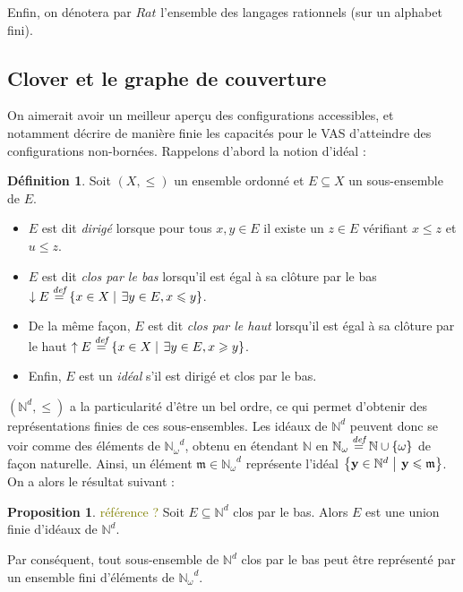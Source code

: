 \documentclass[a4paper,final]{article}
\theoremstyle{definition}
\newtheorem{Definition}[Theorem]{Définition}
\newtheorem{Proposition}[Theorem]{Proposition}
\let\leq\leqslant
\let\geq\geqslant
\newcommand{\lucas}[1]{\textcolor{olive}{#1}}
\newcommand{\set}[2]{\left\{#1\mathrel{\left|\vphantom{#1}\vphantom{#2}\right.}#2\right\}}
\newcommand{\os}[1]{\left\{\mathinner{#1}\right\}}
\newcommand{\defeq}{\ensuremath{\stackrel{\textit{def}}{=}}}
\let\union\cup
\newcommand{\N}{\ensuremath{\mathbb{N}}}
\newcommand{\Nomega}{\ensuremath{\mathbb{N}_\omega}}
\newcommand{\vect}[1]{\ensuremath{\mathbf{#1}}}
\begin{document}
Enfin, on dénotera par $Rat$ l'ensemble des langages rationnels (sur un alphabet fini).

\subsection{Clover et le graphe de couverture}

On aimerait avoir un meilleur aperçu des configurations accessibles, et notamment décrire de manière finie les capacités pour le VAS d'atteindre des configurations non-bornées.
Rappelons d'abord la notion d'idéal :

\begin{Definition}
Soit $(X,\leq)$ un ensemble ordonné et $E\subseteq X$ un sous-ensemble de $E$.
\begin{itemize}
    \item $E$ est dit \emph{dirigé} lorsque pour tous $x,y\in E$ il existe un $z\in E$ vérifiant $x\leq z$ et $u\leq z$.
    \item $E$ est dit \emph{clos par le bas} lorsqu'il est égal à sa clôture par le bas $\downarrow E \defeq \set{x\in X}{\exists y\in E, x\leq y}$.
    \item De la même façon, $E$ est dit \emph{clos par le haut} lorsqu'il est égal à sa clôture par le haut $\uparrow E \defeq \set{x\in X}{\exists y\in E, x \geq y}$.
    \item Enfin, $E$ est un \emph{idéal} s'il est dirigé et clos par le bas.
\end{itemize}
\end{Definition}

$(\N^d,\leq)$ a la particularité d'être un bel ordre, ce qui permet d'obtenir des représentations finies de ces sous-ensembles.
Les idéaux de $\N^d$ peuvent donc se voir comme des éléments de $\Nomega^d$, obtenu en étendant $\N$ en $\Nomega\defeq \N\union\os{\omega}$ de façon naturelle. %
Ainsi, un élément $\mathfrak{m}\in \Nomega^d$ représente l'idéal $\set{\vect{y}\in\N^d}{\vect{y} \leq \mathfrak{m}}$.
On a alors le résultat suivant :

\begin{Proposition}
\lucas{référence ?}
Soit $E \subseteq \N^d$ clos par le bas.
Alors $E$ est une union finie d'idéaux de $\N^d$.
\end{Proposition}

Par conséquent, tout sous-ensemble de $\N^d$ clos par le bas peut être représenté par un ensemble fini d'éléments de $\Nomega^d$.
\end{document}
